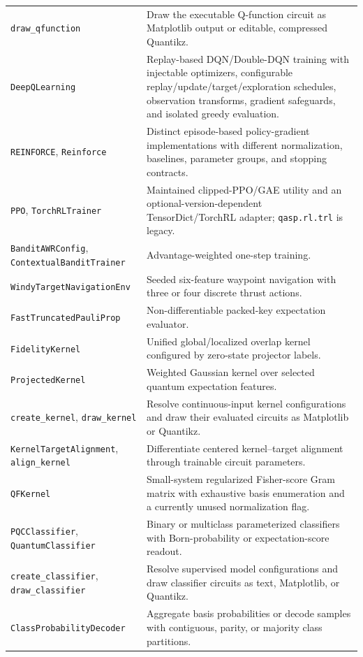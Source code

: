 \documentclass[10pt]{article}
\newcommand{\code}[1]{\texttt{#1}}
\begin{document}
\begin{table}[H]
\begin{tabularx}{\textwidth}{@{}p{}X@{}}
\code{draw\_qfunction} & Draw the executable Q-function circuit as Matplotlib output or editable, compressed Quantikz. \\
\code{DeepQLearning} & Replay-based DQN/Double-DQN training with injectable optimizers, configurable replay/update/target/exploration schedules, observation transforms, gradient safeguards, and isolated greedy evaluation. \\
\code{REINFORCE}, \code{Reinforce} & Distinct episode-based policy-gradient implementations with different normalization, baselines, parameter groups, and stopping contracts. \\
\code{PPO}, \code{TorchRLTrainer} & Maintained clipped-PPO/GAE utility and an optional-version-dependent TensorDict/TorchRL adapter; \code{qasp.rl.trl} is legacy. \\
\code{BanditAWRConfig}, \code{ContextualBanditTrainer} & Advantage-weighted one-step training. \\
\code{WindyTargetNavigationEnv} & Seeded six-feature waypoint navigation with three or four discrete thrust actions. \\
\code{FastTruncatedPauliProp} & Non-differentiable packed-key expectation evaluator. \\
\code{FidelityKernel} & Unified global/localized overlap kernel configured by zero-state projector labels. \\
\code{ProjectedKernel} & Weighted Gaussian kernel over selected quantum expectation features. \\
\code{create\_kernel}, \code{draw\_kernel} & Resolve continuous-input kernel configurations and draw their evaluated circuits as Matplotlib or Quantikz. \\
\code{KernelTargetAlignment}, \code{align\_kernel} & Differentiate centered kernel--target alignment through trainable circuit parameters. \\
\code{QFKernel} & Small-system regularized Fisher-score Gram matrix with exhaustive basis enumeration and a currently unused normalization flag. \\
\code{PQCClassifier}, \code{QuantumClassifier} & Binary or multiclass parameterized classifiers with Born-probability or expectation-score readout. \\
\code{create\_classifier}, \code{draw\_classifier} & Resolve supervised model configurations and draw classifier circuits as text, Matplotlib, or Quantikz. \\
\code{ClassProbabilityDecoder} & Aggregate basis probabilities or decode samples with contiguous, parity, or majority class partitions. \\

\end{tabularx}
\end{table}
\end{document}
